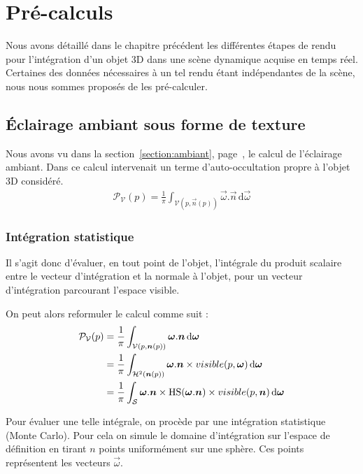 \documentclass[10pt,a4paper,twoside, twocolumn]{report}
\begin{document}
\chapter{Pré-calculs}

Nous avons détaillé dans le chapitre précédent les différentes étapes de rendu pour l'intégration d'un objet 3D dans une scène dynamique acquise en temps réel. Certaines des données nécessaires à un tel rendu étant indépendantes de la scène, nous nous sommes proposés de les pré-calculer. 

\section{Éclairage ambiant sous forme de texture}\label{section:precomputation_ambiant}

Nous avons vu dans la section~\ref{section:ambiant}, page~\pageref{section:ambiant}, le calcul de l'éclairage ambiant. Dans ce calcul intervenait un terme d'auto-occultation propre à l'objet 3D considéré.
\begin{align}
	\mathcal P_{\mathcal V}(p) = \frac{1}{\pi}\int_{\mathcal V(p, \vec n(p))}\vec\omega.\vec n\, \mathrm d\vec\omega
\end{align}

\subsection{Intégration statistique}
Il s’agit donc d'évaluer, en tout point de l'objet, l’intégrale du produit scalaire entre le vecteur d’intégration et la normale à l'objet, pour un vecteur d’intégration parcourant l’espace visible.

On peut alors reformuler le calcul comme suit :
\begin{align}
\mathcal P_{\mathcal V}(p)	&= \frac{1}{\pi}\int_{\mathcal V(p, \vec n(p))}\vec\omega.\vec n\, \mathrm d\vec\omega \notag\\
														&= \frac{1}{\pi}\int_{\mathcal H^2(\vec n(p))}\vec\omega.\vec n\times visible(p, \vec \omega)\, \mathrm d\vec\omega \notag\\
														&= \frac{1}{\pi}\int_{\mathcal S}\vec\omega.\vec n\times \Hs(\vec \omega.\vec n)\times visible(p, \vec n)\, \mathrm d\vec\omega
\end{align}

Pour évaluer une telle intégrale, on procède par une intégration statistique (Monte Carlo). Pour cela on simule le domaine d'intégration sur l'espace de définition en tirant $n$ points uniformément sur une sphère. Ces points représentent les vecteurs $\vec\omega$.
\end{document}

